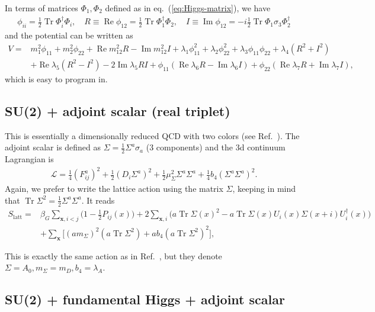 \documentclass[11pt,a4paper]{article}
\newcommand\RE{\operatorname{Re}}
\newcommand\IM{\operatorname{Im}}
\newcommand\Tr{\operatorname{Tr}}
\newcommand\he[1]{#1^\dagger}%
\begin{document}
In terms of matrices $\Phi_1, \Phi_2$ defined as in eq.~(\ref{eq:Higgs-matrix}), we have 
\begin{align}
\phi_{ii} = \frac12 \Tr \he\Phi_i\Phi_i, \quad R \equiv \RE \phi_{12} = \frac12 \Tr \he\Phi_1\Phi_2, \quad I \equiv \IM \phi_{12} = - i\frac12 \Tr \Phi_1 \sigma_3 \he\Phi_2
\end{align}
and the potential can be written as 
\begin{align}
V =& m_1^2 \phi_{11} + m_2^2 \phi_{22} + \RE m_{12}^2 R - \IM m_{12}^2 I + \lambda_1 \phi_{11}^2 + \lambda_2 \phi_{22}^2 + \lambda_3 \phi_{11}\phi_{22} + \lambda_4 (R^2 + I^2)\nonumber \\
& + \RE \lambda_5 (R^2 - I^2) - 2\IM \lambda_5 RI + \phi_{11} (\RE\lambda_6 R - \IM\lambda_6 I) +  \phi_{22} (\RE \lambda_7 R + \IM \lambda_7 I),
\end{align}
which is easy to program in.


\subsection{SU(2) + adjoint scalar (real triplet)}

This is essentially a dimensionally reduced QCD with two colors (see Ref.~\cite{Kajantie:1997tt}). The adjoint scalar is defined as $\Sigma = \frac12 \Sigma^a \sigma_a$ (3 components) and the 3d continuum Lagrangian is 
\begin{align}
\mathcal{L} = \frac14 (F^a_{ij})^2 + \frac12 (D_i \Sigma^a)^2 + \frac12 \mu^2_\Sigma \Sigma^a\Sigma^a + \frac14 b_4 (\Sigma^a\Sigma^a)^2.
\end{align}
Again, we prefer to write the lattice action using the matrix $\Sigma$, keeping in mind that $\Tr \Sigma^2 = \frac12 \Sigma^a \Sigma^a$. It reads
\begin{align}
\label{eq:action_adjoint}
S_\text{latt} =& \beta_G \sum_{\textbf{x}, i<j} \Big(1-\frac12 P_{ij}(x)\Big) + 2\sum_{\textbf{x},i} \Big( a \Tr\Sigma(x)^2 - a \Tr\Sigma(x)U_i(x)\Sigma(x+i)\he U_i(x) \Big) \nonumber \\
& + \sum_\textbf{x} \bigg[ (a m_\Sigma)^2 (a \Tr \Sigma^2) + a b_4 (a \Tr \Sigma^2)^2\bigg],
\end{align}

This is exactly the same action as in Ref.~\cite{Kajantie:1997tt}, but they denote $\Sigma = A_0, m_\Sigma = m_D, b_4 = \lambda_A$.

\subsection{SU(2) + fundamental Higgs + adjoint scalar}
\end{document}
